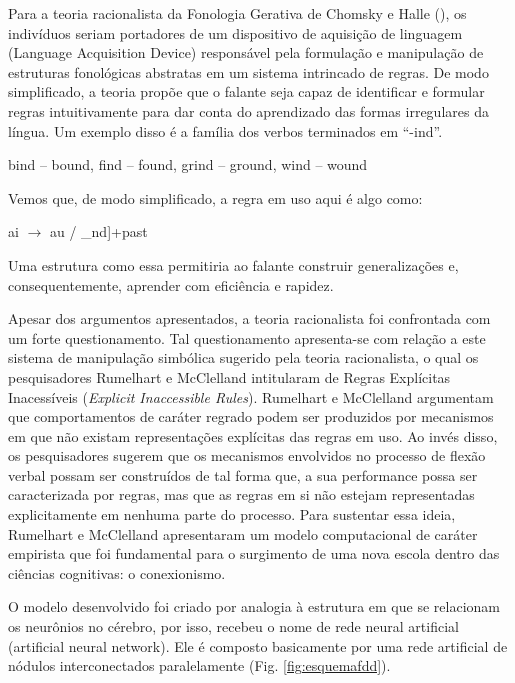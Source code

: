 Para a teoria racionalista da Fonologia Gerativa de Chomsky e Halle (\citeyear{chomsky:1968}), os indivíduos seriam portadores de um dispositivo de aquisição de linguagem (Language Acquisition Device) responsável pela formulação e manipulação de estruturas fonológicas abstratas em um sistema intrincado de regras. De modo simplificado, a teoria propõe que o falante seja capaz de identificar e formular regras intuitivamente para dar conta do aprendizado das formas irregulares da língua. Um exemplo disso é a família dos verbos terminados em “-ind”.

\begin{center}
bind – bound, find – found, grind – ground, wind – wound
\end{center}

Vemos que, de modo simplificado, a regra em uso aqui é algo como:
\begin{center}
ai $\rightarrow$ au / \_nd]+past
\end{center}

Uma estrutura como essa permitiria ao falante construir generalizações e, consequentemente, aprender com eficiência e rapidez. 

Apesar dos argumentos apresentados, a teoria racionalista foi confrontada com um forte questionamento. Tal questionamento apresenta-se com relação a este sistema de manipulação simbólica sugerido pela teoria racionalista, o qual os pesquisadores Rumelhart e McClelland intitularam de Regras Explícitas Inacessíveis (\textit{Explicit Inaccessible Rules}). Rumelhart e McClelland argumentam que comportamentos de caráter regrado podem ser produzidos por mecanismos em que não existam representações explícitas das regras em uso. Ao invés disso, os pesquisadores sugerem que os mecanismos envolvidos no processo de flexão verbal possam ser construídos de tal forma que, a sua performance possa ser caracterizada por regras, mas que as regras em si não estejam representadas explicitamente em nenhuma parte do processo. Para sustentar essa ideia, Rumelhart e McClelland apresentaram um modelo computacional  de caráter empirista que foi fundamental para o surgimento de uma nova escola dentro das ciências cognitivas: o conexionismo.





O modelo desenvolvido foi criado por analogia à estrutura em que se relacionam os neurônios no cérebro, por isso, recebeu o nome de rede neural artificial (artificial neural network). Ele é composto basicamente por uma rede artificial de nódulos interconectados paralelamente (Fig. \ref{fig:esquemafdd}).

